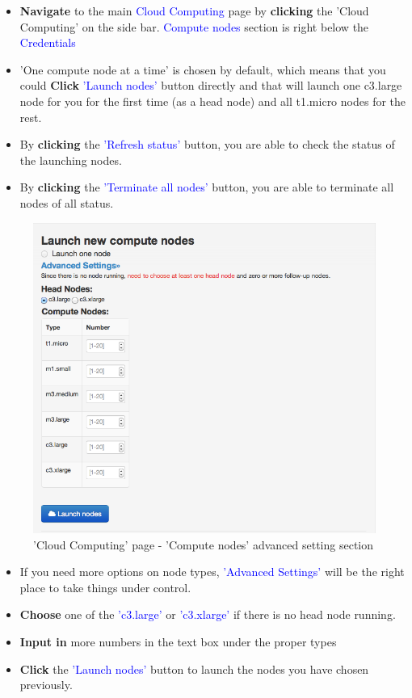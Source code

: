 \documentclass[12pt,notitlepage,nofootinbib]{revtex4}
\begin{document}
\begin{itemize}
\item \textbf{Navigate} to the main \textcolor{blue}{Cloud Computing} page by \textbf{clicking} the 'Cloud Computing' on the side bar. \textcolor{blue}{Compute nodes} section is right below the \textcolor{blue}{Credentials}
\item 'One compute node at a time' is chosen by default, which means that you could \textbf{Click} \textcolor{blue}{'Launch nodes'} button directly and that will launch one c3.large node for you for the first time (as a head node) and all t1.micro nodes for the rest.
\item By \textbf{clicking} the \textcolor{blue}{'Refresh status'} button, you are able to check the status of the launching nodes.
\item By \textbf{clicking} the \textcolor{blue}{'Terminate all nodes'} button, you are able to terminate all nodes of all status. 

\end{itemize}

\begin{figure}[!ht]
\centering
\includegraphics[scale=0.45]{T6_fig_computenode2.png}
\caption{'Cloud Computing' page - 'Compute nodes' advanced setting section}
\label{fig:2}
\end{figure}

\begin{itemize}
\item If you need more options on node types, \textcolor{blue}{'Advanced Settings'} will be the right place to take things under control.
\item \textbf{Choose} one of the \textcolor{blue}{'c3.large'} or \textcolor{blue}{'c3.xlarge'} if there is no head node running.
\item \textbf{Input in} more numbers in the text box under the proper types
\item \textbf{Click} the \textcolor{blue}{'Launch nodes'} button to launch the nodes you have chosen previously.

\end{itemize}
\end{document}
